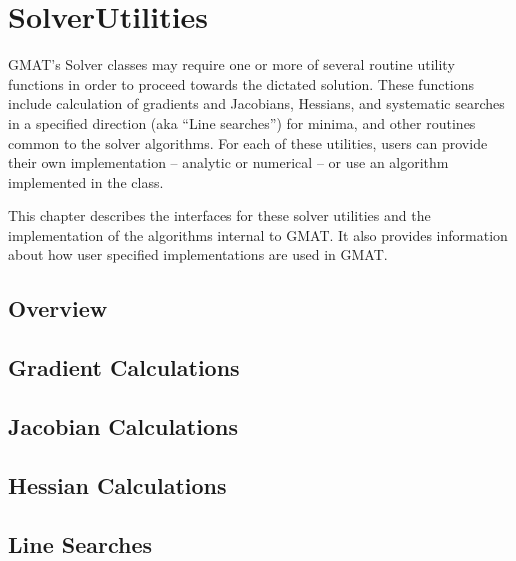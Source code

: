 \chapter{\label{chapter:SolverUtil}SolverUtilities}

GMAT's Solver classes may require one or more of several routine utility functions in order to
proceed towards the dictated solution.  These functions include calculation of gradients and
Jacobians, Hessians, and systematic searches in a specified direction (aka ``Line searches'') for
minima, and other routines common to the solver algorithms.  For each of these utilities, users can
provide their own implementation -- analytic or numerical -- or use an algorithm implemented in the
class.

This chapter describes the interfaces for these solver utilities and the implementation of the
algorithms internal to GMAT.  It also provides information about how user specified implementations
are used in GMAT.

\section{Overview}



\section{Gradient Calculations}

\section{Jacobian Calculations}

\section{Hessian Calculations}

\section{Line Searches}

